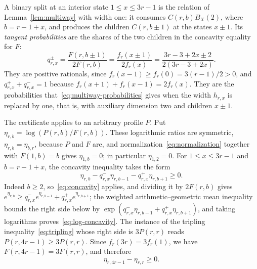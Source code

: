 A binary split at an interior state \(1\le x\le3r-1\) is the relation of
Lemma~\ref{lem:multiway} with width one: it consumes \(C(r,b)B_X(2)\),
where \(b=r-1+x\), and produces the children \(C(r,b\pm1)\) at the
states \(x\pm1\). Its \emph{tangent probabilities} are the shares of the
two children in the concavity equality for \(F\):
\begin{equation}\label{eq:probabilities}
 q^\pm_{r,x}=\frac{F(r,b\pm1)}{2F(r,b)}=\frac{f_r(x\pm1)}{2f_r(x)}
 =\frac{3r-3+2x\pm2}{2(3r-3+2x)}.
\end{equation}
They are positive rationals, since \(f_r(x-1)\ge f_r(0)=3(r-1)/2>0\),
and \(q^+_{r,x}+q^-_{r,x}=1\) because \(f_r(x+1)+f_r(x-1)=2f_r(x)\).
They are the probabilities that~\eqref{eq:multiway-probabilities} gives
when the width \(h_{r,x}\) is replaced by one, that is, with auxiliary
dimension two and children \(x\pm1\).

The certificate applies to an arbitrary profile \(P\). Put
\(\eta_{r,b}=\log(P(r,b)/F(r,b))\). These logarithmic ratios are
symmetric, \(\eta_{r,b}=\eta_{b,r}\), because \(P\) and \(F\) are, and
normalization~\eqref{eq:normalization} together with \(F(1,b)=b\) gives
\(\eta_{1,b}=0\); in particular \(\eta_{1,2}=0\). For \(1\le x\le3r-1\)
and \(b=r-1+x\), the concavity inequality takes the form
\begin{equation}\label{eq:log-concavity}
 \eta_{r,b}-q^-_{r,x}\eta_{r,b-1}-q^+_{r,x}\eta_{r,b+1}\ge0.
\end{equation}
Indeed \(b\ge2\), so~\eqref{eq:concavity} applies, and dividing it by
\(2F(r,b)\) gives
\(e^{\eta_{r,b}}\ge q^-_{r,x}e^{\eta_{r,b-1}}+q^+_{r,x}e^{\eta_{r,b+1}}\);
the weighted arithmetic--geometric mean inequality bounds the right side
below by \(\exp(q^-_{r,x}\eta_{r,b-1}+q^+_{r,x}\eta_{r,b+1})\), and taking
logarithms proves~\eqref{eq:log-concavity}. The instance of
the tripling inequality~\eqref{eq:tripling} whose right side is
\(3P(r,r)\) reads \(P(r,4r-1)\ge3P(r,r)\). Since \(f_r(3r)=3f_r(1)\), we
have \(F(r,4r-1)=3F(r,r)\), and therefore
\begin{equation}\label{eq:log-tripling}
 \eta_{r,4r-1}-\eta_{r,r}\ge0.
\end{equation}

